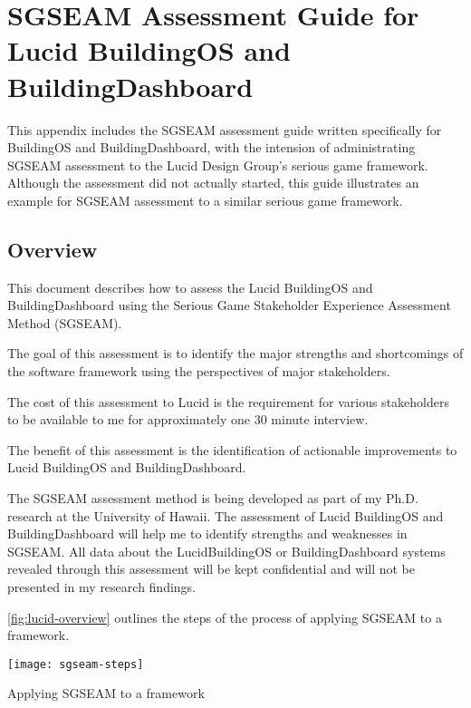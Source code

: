 \chapter{SGSEAM Assessment Guide for Lucid BuildingOS and
BuildingDashboard}
\label{app:sgseam-lucid-guide}

This appendix includes the SGSEAM assessment guide written specifically for BuildingOS and BuildingDashboard, with the intension of administrating SGSEAM assessment to the Lucid Design Group's serious game framework. Although the assessment did not actually started, this guide illustrates an example for SGSEAM assessment to a similar serious game framework.

\section{Overview}

This document describes how to assess the Lucid BuildingOS and
BuildingDashboard using the Serious Game Stakeholder Experience
Assessment Method (SGSEAM). 

The goal of this assessment is to identify the major strengths and
shortcomings of the software framework using the perspectives of major
stakeholders. 

The cost of this assessment to Lucid is the requirement for various
stakeholders to be available to me for approximately one 30 minute interview. 

The benefit of this assessment is the identification of actionable
improvements to Lucid BuildingOS and BuildingDashboard.

The SGSEAM assessment method is being developed as part of my
Ph.D. research at the University of Hawaii.  The assessment of Lucid
BuildingOS and BuildingDashboard will help me to identify strengths
and weaknesses in SGSEAM.  All data about the LucidBuildingOS or
BuildingDashboard systems revealed through this assessment will be kept
confidential and will not be presented in my research findings. 

\autoref{fig:lucid-overview} outlines the steps of the process of applying SGSEAM to a framework.

\begin{table}[ht!]
  \center
  \texttt{[image: sgseam-steps]}
  \caption{Applying SGSEAM to a framework}
  \label{fig:lucid-overview}
\end{table}

